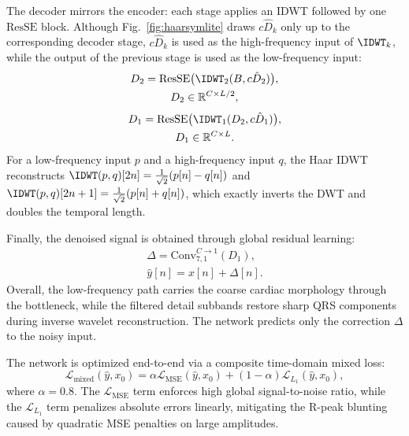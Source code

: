 The decoder mirrors the encoder: each stage applies an IDWT followed by one $\mathrm{ResSE}$ block. Although Fig.~\ref{fig:haarsymlite} draws $c\hat{D}_k$ only up to the corresponding decoder stage, $c\hat{D}_k$ is used as the high-frequency input of $\IDWT_k$, while the output of the previous stage is used as the low-frequency input:
\begin{equation}
\begin{gathered}
D_2 = \mathrm{ResSE}\big(\IDWT_2(B, c\hat{D}_2)\big), \\
D_2 \in \mathbb{R}^{C \times L/2},
\end{gathered}
\end{equation}
\begin{equation}
\begin{gathered}
D_1 = \mathrm{ResSE}\big(\IDWT_1(D_2, c\hat{D}_1)\big), \\
D_1 \in \mathbb{R}^{C \times L}.
\end{gathered}
\end{equation}
For a low-frequency input $p$ and a high-frequency input $q$, the Haar IDWT reconstructs $\IDWT(p, q)[2n] = \frac{1}{\sqrt{2}}(p[n] - q[n])$ and $\IDWT(p, q)[2n+1] = \frac{1}{\sqrt{2}}(p[n] + q[n])$, which exactly inverts the DWT and doubles the temporal length.

Finally, the denoised signal is obtained through global residual learning:
\begin{equation}
\begin{gathered}
\Delta = \mathrm{Conv}_{7,1}^{C \to 1}(D_1), \\
\hat{y}[n] = x[n] + \Delta[n].
\end{gathered}
\end{equation}
Overall, the low-frequency path carries the coarse cardiac morphology through the bottleneck, while the filtered detail subbands restore sharp QRS components during inverse wavelet reconstruction. The network predicts only the correction $\Delta$ to the noisy input.

The network is optimized end-to-end via a composite time-domain mixed loss:
\begin{equation}
\mathcal{L}_{\mathrm{mixed}}(\hat{y}, x_0) = \alpha \mathcal{L}_{\mathrm{MSE}}(\hat{y}, x_0) + (1-\alpha) \mathcal{L}_{L_1}(\hat{y}, x_0),
\label{eq:mixed_loss}
\end{equation}
where $\alpha = 0.8$. The $\mathcal{L}_{\mathrm{MSE}}$ term enforces high global signal-to-noise ratio, while the $\mathcal{L}_{L_1}$ term penalizes absolute errors linearly, mitigating the R-peak blunting caused by quadratic MSE penalties on large amplitudes.

